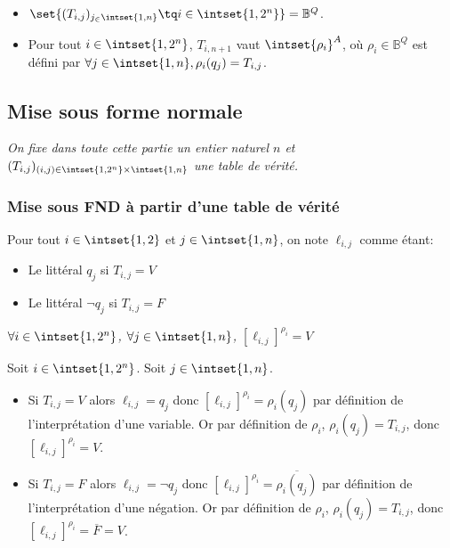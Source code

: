 \documentclass{scrartcl}
\begin{document}
			\begin{itemize}
				\item $\set{(T_{i,j})_{j_\in\intset{1,n}} \tq i\in \intset{1,2^n}} = \mathbb{B}^Q$.
				\item Pour tout $i \in \intset{1,2^n}$, $T_{i,n+1}$ vaut $\intset{\rho_i}^A$,
					où $\rho_i \in \mathbb{B}^Q$ est défini par $\forall j \in \intset{1,n}, \rho_i(q_j) = T_{i,j}$.
			\end{itemize}
		\subsection{Mise sous forme normale}
			\begin{center}\textsl{On fixe dans toute cette partie un entier naturel $n$ 
			et $(T_{i,j})_{(i,j)\in\intset{1,2^n}\times\intset{1,n}}$ une table de vérité.}\end{center}
			\subsubsection{Mise sous FND à partir d'une table de vérité}
				Pour tout $i \in \intset{1,2}$ et $j \in \intset{1,n}$, on note $\ell_{i,j}$ comme étant:

				\begin{itemize}
					\item Le littéral $q_j$ si $T_{i,j} = V$
					\item Le littéral $\neg q_j$ si $T_{i,j} = F$
				\end{itemize}

				\lemma \textsl{$\forall i \in \intset{1,2^n}$, $\forall j \in \intset{1,n}$, $[\ell_{i,j}]^{\rho_i} = V$}
				\begin{demo}
					\item Soit $i \in \intset{1,2^n}$. Soit $j \in \intset{1,n}$.
					\begin{itemize}
						\item Si $T_{i,j} = V$ alors $\ell_{i,j} = q_j$ donc $[\ell_{i,j}]^{\rho_i} = \rho_i(q_j)$ par définition de l'interprétation d'une variable. 
						Or par définition de $\rho_i$, $\rho_i(q_j) = T_{i,j}$, donc $[\ell_{i,j}]^{\rho_i}=V$.
						\item Si $T_{i,j} = F$ alors $\ell_{i,j} = \neg q_j$ donc $[\ell_{i,j}]^{\rho_i} = \overline{\rho_i(q_j)}$ par définition de l'interprétation d'une négation. 
						Or par définition de $\rho_i$, $\rho_i(q_j) = T_{i,j}$, donc $[\ell_{i,j}]^{\rho_i}=\overline{F}=V$.
					\end{itemize}
				\end{demo}
\end{document}
